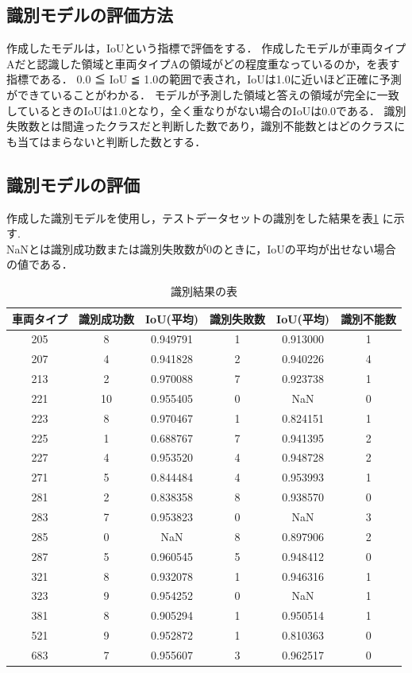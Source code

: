 \subsection{識別モデルの評価方法}
作成したモデルは，IoUという指標で評価をする．
作成したモデルが車両タイプAだと認識した領域と車両タイプAの領域がどの程度重なっているのか，を表す指標である．
0.0 ≦ IoU ≦ 1.0の範囲で表され，IoUは1.0に近いほど正確に予測ができていることがわかる．
モデルが予測した領域と答えの領域が完全に一致しているときのIoUは1.0となり，全く重なりがない場合のIoUは0.0である．
識別失敗数とは間違ったクラスだと判断した数であり，識別不能数とはどのクラスにも当てはまらないと判断した数とする．
\subsection{識別モデルの評価}
作成した識別モデルを使用し，テストデータセットの識別をした結果を表\ref{tab:identification_results} に示す.\\
NaNとは識別成功数または識別失敗数が0のときに，IoUの平均が出せない場合の値である．
\begin{table}[htbp] 
	\centering
	\begin{tabular}{cccccc}
		\hline
		車両タイプ & 識別成功数 & IoU(平均) & 識別失敗数 & IoU(平均) & 識別不能数 \\
		\hline \hline
		\hline
		205 & 8 & 0.949791 & 1 & 0.913000 & 1 \\
		207 & 4 & 0.941828 & 2 & 0.940226 & 4 \\
		213 & 2 & 0.970088 & 7 & 0.923738 & 1 \\
		221 & 10 & 0.955405 & 0 & NaN & 0 \\
		223 & 8 & 0.970467 & 1 & 0.824151 & 1 \\
		225 & 1 & 0.688767 & 7 & 0.941395 & 2 \\
		227 & 4 & 0.953520 & 4 & 0.948728 & 2 \\
		271 & 5 & 0.844484 & 4 & 0.953993 & 1 \\
		281 & 2 & 0.838358 & 8 & 0.938570 & 0 \\
		283 & 7 & 0.953823 & 0 & NaN & 3 \\
		285 & 0 & NaN & 8 & 0.897906 & 2 \\
		287 & 5 & 0.960545 & 5 & 0.948412 & 0 \\
		321 & 8 & 0.932078 & 1 & 0.946316 & 1 \\
		323 & 9 & 0.954252 & 0 & NaN & 1 \\
		381 & 8 & 0.905294 & 1 & 0.950514 & 1 \\
		521 & 9 & 0.952872 & 1 & 0.810363 & 0 \\
		683 & 7 & 0.955607 & 3 & 0.962517 & 0 \\
		\hline
	\end{tabular}
	\caption{識別結果の表}
	\label{tab:identification_results}
\end{table}

